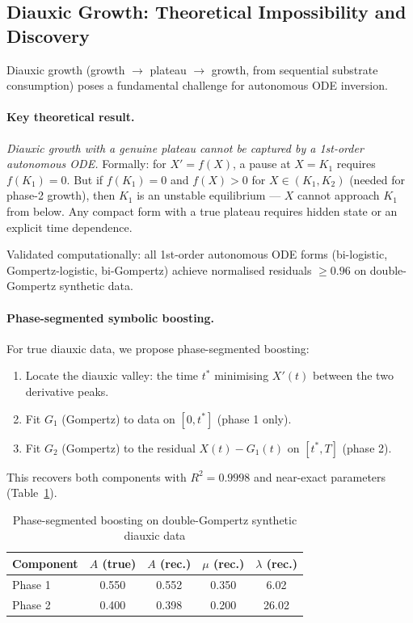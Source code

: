 \documentclass[11pt,a4paper]{article}
\begin{document}
\subsection{Diauxic Growth: Theoretical Impossibility and Discovery}

Diauxic growth (growth $\to$ plateau $\to$ growth, from sequential substrate consumption)
poses a fundamental challenge for autonomous ODE inversion.

\paragraph{Key theoretical result.}
\emph{Diauxic growth with a genuine plateau cannot be captured by a 1st-order
autonomous ODE.} Formally: for $X' = f(X)$, a pause at $X = K_1$ requires $f(K_1) = 0$.
But if $f(K_1) = 0$ and $f(X) > 0$ for $X \in (K_1, K_2)$ (needed for phase-2 growth),
then $K_1$ is an unstable equilibrium — $X$ cannot approach $K_1$ from below. Any
compact form with a true plateau requires hidden state or an explicit time dependence.

Validated computationally: all 1st-order autonomous ODE forms (bi-logistic, Gompertz-logistic,
bi-Gompertz) achieve normalised residuals $\geq 0.96$ on double-Gompertz synthetic data.

\paragraph{Phase-segmented symbolic boosting.}
For true diauxic data, we propose phase-segmented boosting:
\begin{enumerate}
  \item Locate the diauxic valley: the time $t^*$ minimising $X'(t)$ between the two
        derivative peaks.
  \item Fit $G_1$ (Gompertz) to data on $[0, t^*]$ (phase 1 only).
  \item Fit $G_2$ (Gompertz) to the residual $X(t) - G_1(t)$ on $[t^*, T]$ (phase 2).
\end{enumerate}
This recovers both components with $R^2 = 0.9998$ and near-exact parameters
(Table~\ref{tab:diauxic}).

\begin{table}[h]
\centering
\caption{Phase-segmented boosting on double-Gompertz synthetic diauxic data}
\label{tab:diauxic}
\begin{tabular}{lcccc}
\toprule
Component & $A$ (true) & $A$ (rec.) & $\mu$ (rec.) & $\lambda$ (rec.) \\
\midrule
Phase 1 & 0.550 & 0.552 & 0.350 & 6.02 \\
Phase 2 & 0.400 & 0.398 & 0.200 & 26.02 \\
\bottomrule
\end{tabular}
\end{table}
\end{document}
